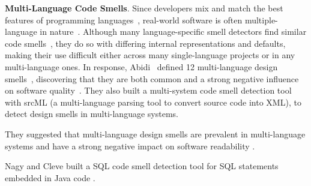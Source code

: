 





{\bf Multi-Language Code Smells}.
%
Since developers mix and match the best features of programming
languages~\cite{7476675}, real-world software is often multiple-language in
nature~\cite{723183}.
%
Although many language-specific smell detectors find similar code
smells~\cite{PMD,CheckStyle,Pysmell,Jscent,DesigniteJava}, they do so with
differing internal representations and defaults, making their use difficult
either across many single-language projects or in any multi-language ones.
%
In response, Abidi~\etal{} defined 12 multi-language design
smells~\cite{MultiLanguageCodeSmells}, discovering that they are both common
and a strong negative influence on software quality~\cite{Abidi2}. They also
built a multi-system code smell detection tool with srcML (a multi-language
parsing tool to convert source code into XML), to detect design smells in
multi-language systems.

They suggested that multi-language design smells are prevalent in
multi-language systems and have a strong negative impact on software
readability \cite{Fault-Prone}.

Nagy and Cleve built a SQL code smell detection tool for SQL statements
embedded in Java code \cite{SQLInJava}.
